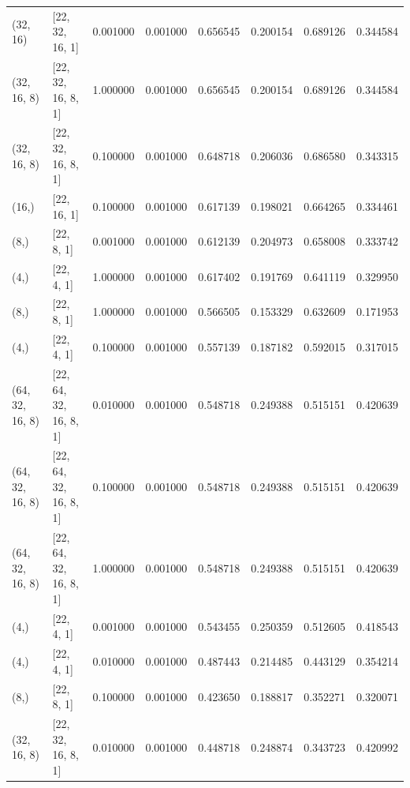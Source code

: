 \begin{tabular}{llrrrrrr}
(32, 16) & [22, 32, 16, 1] & 0.001000 & 0.001000 & 0.656545 & 0.200154 & 0.689126 & 0.344584 \\
(32, 16, 8) & [22, 32, 16, 8, 1] & 1.000000 & 0.001000 & 0.656545 & 0.200154 & 0.689126 & 0.344584 \\
(32, 16, 8) & [22, 32, 16, 8, 1] & 0.100000 & 0.001000 & 0.648718 & 0.206036 & 0.686580 & 0.343315 \\
(16,) & [22, 16, 1] & 0.100000 & 0.001000 & 0.617139 & 0.198021 & 0.664265 & 0.334461 \\
(8,) & [22, 8, 1] & 0.001000 & 0.001000 & 0.612139 & 0.204973 & 0.658008 & 0.333742 \\
(4,) & [22, 4, 1] & 1.000000 & 0.001000 & 0.617402 & 0.191769 & 0.641119 & 0.329950 \\
(8,) & [22, 8, 1] & 1.000000 & 0.001000 & 0.566505 & 0.153329 & 0.632609 & 0.171953 \\
(4,) & [22, 4, 1] & 0.100000 & 0.001000 & 0.557139 & 0.187182 & 0.592015 & 0.317015 \\
(64, 32, 16, 8) & [22, 64, 32, 16, 8, 1] & 0.010000 & 0.001000 & 0.548718 & 0.249388 & 0.515151 & 0.420639 \\
(64, 32, 16, 8) & [22, 64, 32, 16, 8, 1] & 0.100000 & 0.001000 & 0.548718 & 0.249388 & 0.515151 & 0.420639 \\
(64, 32, 16, 8) & [22, 64, 32, 16, 8, 1] & 1.000000 & 0.001000 & 0.548718 & 0.249388 & 0.515151 & 0.420639 \\
(4,) & [22, 4, 1] & 0.001000 & 0.001000 & 0.543455 & 0.250359 & 0.512605 & 0.418543 \\
(4,) & [22, 4, 1] & 0.010000 & 0.001000 & 0.487443 & 0.214485 & 0.443129 & 0.354214 \\
(8,) & [22, 8, 1] & 0.100000 & 0.001000 & 0.423650 & 0.188817 & 0.352271 & 0.320071 \\
(32, 16, 8) & [22, 32, 16, 8, 1] & 0.010000 & 0.001000 & 0.448718 & 0.248874 & 0.343723 & 0.420992 \\
\bottomrule
\end{tabular}
